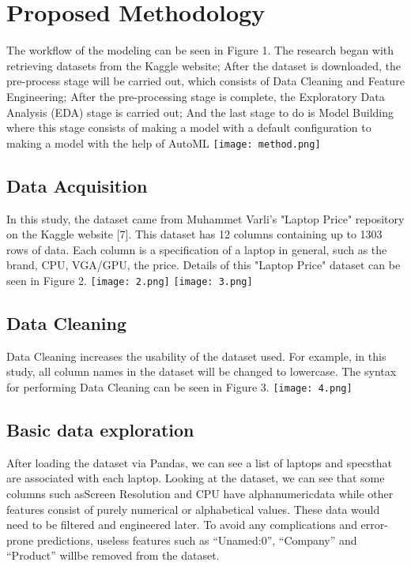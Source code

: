 \documentclass[
11pt, %
english, %
singlespacing, %
headsepline, %
]{MastersDoctoralThesis} %
\begin{document}
\chapter{Proposed Methodology}
 The workflow 
of the modeling can be seen in Figure 1. The 
research began with retrieving datasets from the 
Kaggle website; After the dataset is downloaded, the 
pre-process stage will be carried out, which consists 
of Data Cleaning and Feature Engineering; After the 
pre-processing stage is complete, the Exploratory 
Data Analysis (EDA) stage is carried out; And the 
last stage to do is Model Building where this stage 
consists of making a model with a default 
configuration to making a model with the help of 
AutoML\hfill\break\break\break\break
\hspace*{0cm}                                                           
   \texttt{[image: method.png]}
\section{ Data Acquisition}
In this study, the dataset came from Muhammet 
Varli's "Laptop Price" repository on the Kaggle 
website [7]. This dataset has 12 columns containing 
up to 1303 rows of data. Each column is a 
specification of a laptop in general, such as the 
brand, CPU, VGA/GPU, the price. Details of this 
"Laptop Price" dataset can be seen in Figure 2.\hfill
\vspace*{1cm}
    \hspace*{-1cm}                                                           
        \texttt{[image: 2.png]}
\vspace*{0.3cm}
    \hspace*{6cm}                                                           
        \texttt{[image: 3.png]}
\section{Data Cleaning}
Data Cleaning increases the usability of the 
dataset used. For example, in this study, all 
column names in the dataset will be changed to 
lowercase. The syntax for performing Data Cleaning 
can be seen in Figure 3.\hfill
\vspace*{1cm}
    \hspace*{0cm}                                                           
        \texttt{[image: 4.png]}
\section{Basic data exploration}
After loading the dataset via Pandas, we can see a
list of laptops and specsthat are associated with each 
laptop. Looking at the dataset, we can see that some 
columns such asScreen Resolution and CPU have 
alphanumericdata while other features consist of
purely numerical or alphabetical values. These data
would need to be filtered and engineered later. To 
avoid any complications and error-prone
predictions, useless features such as “Unamed:0”, 
“Company” and “Product” willbe removed from the
dataset.
\end{document}
